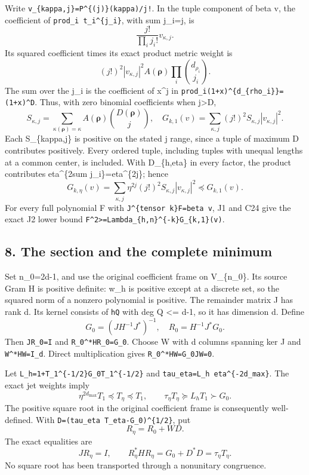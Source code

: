 \documentclass[11pt]{article}
\begin{document}
Write \texttt{v\_\{kappa,j\}=P\^{}\{(j)\}(kappa)/j!}. In the tuple component of beta v, the coefficient of \texttt{prod\_i\ t\_i\^{}\{j\_i\}}, with sum j\_i=j, is \[
\frac{j!}{\prod_i j_i!}v_{\kappa,j}.
\] Its squared coefficient times its exact product metric weight is \[
(j!)^2 |v_{\kappa,j}|^2 A(\boldsymbol\rho)
 \prod_i\binom{d_{\rho_i}}{j_i}.
\] The sum over the j\_i is the coefficient of x\^{}j in \texttt{prod\_i(1+x)\^{}\{d\_\{rho\_i\}\}=(1+x)\^{}D}. Thus, with zero binomial coefficients when j\textgreater D, \[
S_{\kappa,j}=\sum_{\kappa(\boldsymbol\rho)=\kappa}
A(\boldsymbol\rho)\binom{D(\boldsymbol\rho)}j,
\quad
G_{k,1}(v)=\sum_{\kappa,j}(j!)^2S_{\kappa,j}|v_{\kappa,j}|^2.
\tag{C24}
\] Each S\_\{kappa,j\} is positive on the stated j range, since a tuple of maximum D contributes positively. Every ordered tuple, including tuples with unequal lengths at a common center, is included. With D\_\{h,eta\} in every factor, the product contributes eta\^{}\{2sum j\_i\}=eta\^{}\{2j\}; hence \[
G_{k,\eta}(v)=\sum_{\kappa,j}\eta^{2j}(j!)^2S_{\kappa,j}|v_{\kappa,j}|^2
\preceq G_{k,1}(v).
\tag{C25}
\] For every full polynomial F with \texttt{J\^{}\{tensor\ k\}F=beta\ v}, J1 and C24 give the exact J2 lower bound \texttt{\textbar{}\textbar{}F\textbar{}\textbar{}\^{}2\textgreater{}=Lambda\_\{h,n\}\^{}\{-k\}G\_\{k,1\}(v)}.

\subsection{8. The section and the complete minimum}\label{mrcoerc:the-section-and-the-complete-minimum}

Set n\_0=2d-1, and use the original coefficient frame on V\_\{n\_0\}. Its source Gram H is positive definite: w\_h is positive except at a discrete set, so the squared norm of a nonzero polynomial is positive. The remainder matrix J has rank d. Its kernel consists of \texttt{hQ} with deg Q \textless= d-1, so it has dimension d. Define \[
G_0=(JH^{-1}J^*)^{-1},\quad R_0=H^{-1}J^*G_0.
\] Then \texttt{JR\_0=I} and \texttt{R\_0\^{}*HR\_0=G\_0}. Choose W with d columns spanning ker J and \texttt{W\^{}*HW=I\_d}. Direct multiplication gives \texttt{R\_0\^{}*HW=G\_0JW=0}.

Let \texttt{L\_h=1+\textbar{}\textbar{}T\_1\^{}\{-1/2\}G\_0T\_1\^{}\{-1/2\}\textbar{}\textbar{}} and \texttt{tau\_eta=L\_h\ eta\^{}\{-2d\_max\}}. The exact jet weights imply \[
\eta^{2d_{\max}}T_1\preceq T_\eta\preceq T_1,
\qquad \tau_\eta T_\eta\succeq L_hT_1\succ G_0.
\] The positive square root in the original coefficient frame is consequently well-defined. With \texttt{D=(tau\_eta\ T\_eta-G\_0)\^{}\{1/2\}}, put \[
R_\eta=R_0+WD.
\] The exact equalities are \[
JR_\eta=I,\qquad R_\eta^*HR_\eta
=G_0+D^*D=\tau_\eta T_\eta.
\tag{C26}
\] No square root has been transported through a nonunitary congruence.
\end{document}
